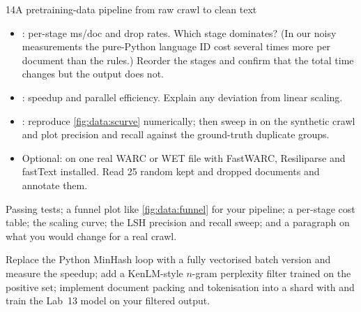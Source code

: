 \begin{labbox}{14}{A pretraining-data pipeline from raw crawl to clean text}
\begin{itemize}
  \item {}: per-stage ms/doc and drop rates. Which stage
        dominates? (In our noisy measurements the pure-Python language ID cost several times more
        per document than the rules.) Reorder the stages and confirm that the total time changes but the output does not.
  \item {}: speedup and parallel efficiency. Explain any
        deviation from linear scaling.
  \item {}: reproduce \cref{fig:data:scurve} numerically; then sweep 
        in  on the synthetic crawl and plot precision and recall against the ground-truth
        duplicate groups.
  \item Optional:  on one real WARC or WET file with FastWARC, Resiliparse and fastText
        installed. Read 25 random kept and dropped documents and annotate them.
\end{itemize}

Passing tests; a funnel plot like \cref{fig:data:funnel} for your pipeline; a per-stage cost
table; the scaling curve; the LSH precision and recall sweep; and a paragraph on what you would change
for a real crawl.

Replace the Python MinHash loop with a fully vectorised batch version and measure the speedup;
add a KenLM-style $n$-gram perplexity filter trained on the positive set; implement document
packing and tokenisation into a  shard with 
and train the Lab~13 model on your filtered output.
\end{labbox}
